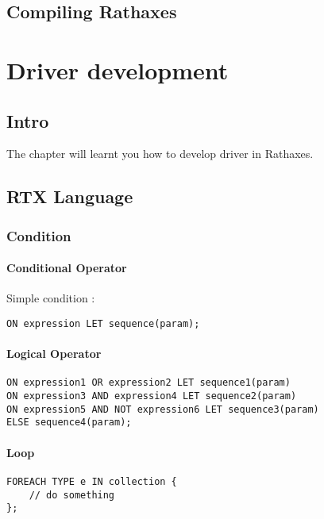 \documentclass{rtxreport}
\begin{document}
\section{Compiling Rathaxes}
\lipsum[3]

\chapter{Driver development}

\section{Intro}
The chapter will learnt you how to develop  driver in Rathaxes.


\section{RTX Language}

\subsection{Condition}


\subsubsection{Conditional Operator}

Simple condition :

\begin{lstlisting}
ON expression LET sequence(param);
\end{lstlisting}


\subsubsection{Logical Operator}
\begin{lstlisting}
ON expression1 OR expression2 LET sequence1(param)
ON expression3 AND expression4 LET sequence2(param)
ON expression5 AND NOT expression6 LET sequence3(param)
ELSE sequence4(param);
\end{lstlisting}

\subsubsection{Loop}
\begin{lstlisting}
FOREACH TYPE e IN collection {
	// do something
};
\end{lstlisting}
\end{document}

